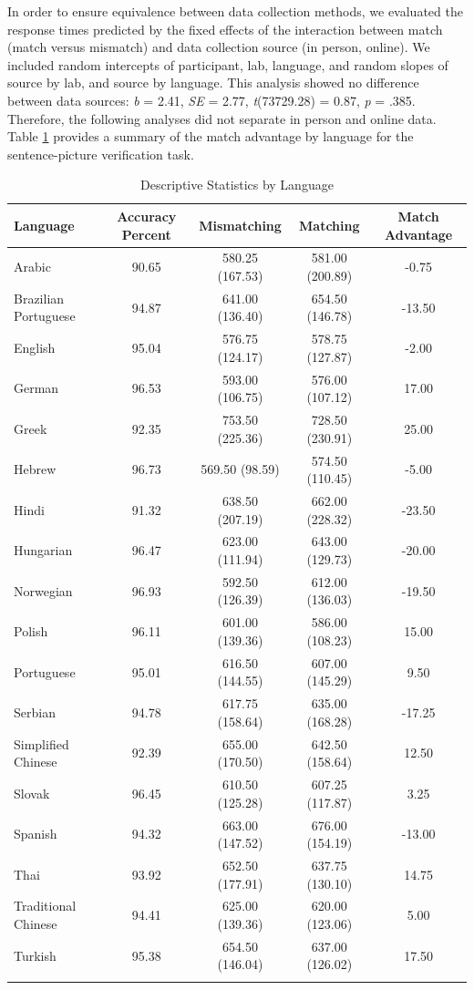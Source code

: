 \documentclass[
  man]{apa7}
\begin{document}
In order to ensure equivalence between data collection methods, we evaluated the response times predicted by the fixed effects of the interaction between match (match versus mismatch) and data collection source (in person, online). We included random intercepts of participant, lab, language, and random slopes of source by lab, and source by language. This analysis showed no difference between data sources: \emph{b} = 2.41, \emph{SE} = 2.77, \emph{t}(73729.28) = 0.87, \emph{p} = .385. Therefore, the following analyses did not separate in person and online data. Table \ref{tab:summary-languages} provides a summary of the match advantage by language for the sentence-picture verification task.

\begin{table}[tbp]

\begin{center}
\begin{threeparttable}

\caption{\label{tab:summary-languages}Descriptive Statistics by Language}

\begin{tabular}{lcccc}
\toprule
Language & Accuracy Percent & Mismatching & Matching & Match Advantage\\
\midrule
Arabic & 90.65 & 580.25 (167.53) & 581.00 (200.89) & -0.75\\
Brazilian Portuguese & 94.87 & 641.00 (136.40) & 654.50 (146.78) & -13.50\\
English & 95.04 & 576.75 (124.17) & 578.75 (127.87) & -2.00\\
German & 96.53 & 593.00 (106.75) & 576.00 (107.12) & 17.00\\
Greek & 92.35 & 753.50 (225.36) & 728.50 (230.91) & 25.00\\
Hebrew & 96.73 & 569.50 (98.59) & 574.50 (110.45) & -5.00\\
Hindi & 91.32 & 638.50 (207.19) & 662.00 (228.32) & -23.50\\
Hungarian & 96.47 & 623.00 (111.94) & 643.00 (129.73) & -20.00\\
Norwegian & 96.93 & 592.50 (126.39) & 612.00 (136.03) & -19.50\\
Polish & 96.11 & 601.00 (139.36) & 586.00 (108.23) & 15.00\\
Portuguese & 95.01 & 616.50 (144.55) & 607.00 (145.29) & 9.50\\
Serbian & 94.78 & 617.75 (158.64) & 635.00 (168.28) & -17.25\\
Simplified Chinese & 92.39 & 655.00 (170.50) & 642.50 (158.64) & 12.50\\
Slovak & 96.45 & 610.50 (125.28) & 607.25 (117.87) & 3.25\\
Spanish & 94.32 & 663.00 (147.52) & 676.00 (154.19) & -13.00\\
Thai & 93.92 & 652.50 (177.91) & 637.75 (130.10) & 14.75\\
Traditional Chinese & 94.41 & 625.00 (139.36) & 620.00 (123.06) & 5.00\\
Turkish & 95.38 & 654.50 (146.04) & 637.00 (126.02) & 17.50\\
\bottomrule
\addlinespace
\end{tabular}


\end{threeparttable}
\end{center}
\end{table}
\end{document}
